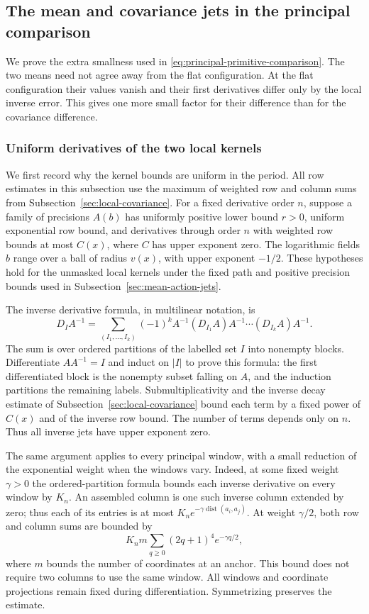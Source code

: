 \subsection{The mean and covariance jets in the principal comparison}
\label{sec:principal-comparison-jets}
We prove the extra smallness used in
\eqref{eq:principal-primitive-comparison}. The two means need not
agree away from the flat configuration. At the flat configuration
their values vanish and their first derivatives differ only by the
local inverse error. This gives one more small factor for their
difference than for the covariance difference.

\subsubsection{Uniform derivatives of the two local kernels}
We first record why the kernel bounds are uniform in the period.
All row estimates in this subsection use the maximum of weighted
row and column sums from Subsection~\ref{sec:local-covariance}.
For a fixed derivative order $n$, suppose a family of precisions
$A(b)$ has uniformly positive lower bound $r>0$, uniform
exponential row bound, and derivatives through order $n$ with
weighted row bounds at most $C(x)$, where $C$ has upper exponent
zero. The logarithmic fields $b$ range over a ball of radius
$v(x)$, with upper exponent $-1/2$. These hypotheses hold for
the unmasked local kernels under the fixed path and positive
precision bounds used in Subsection~\ref{sec:mean-action-jets}.

The inverse derivative formula, in multilinear notation, is
\begin{equation}\label{eq:comparison-inverse-derivative}
 D_I A^{-1}=
 \sum_{(I_1,\ldots,I_k)}(-1)^k
     A^{-1}(D_{I_1}A)A^{-1}\cdots(D_{I_k}A)A^{-1}.
\end{equation}
The sum is over ordered partitions of the labelled set $I$ into
nonempty blocks. Differentiate $AA^{-1}=I$ and induct on $|I|$
to prove this formula: the first differentiated block is the
nonempty subset falling on $A$, and the induction partitions the
remaining labels. Submultiplicativity and the inverse decay
estimate of Subsection~\ref{sec:local-covariance} bound each term
by a fixed power of $C(x)$ and of the inverse row bound.
The number of terms depends only on $n$. Thus all inverse jets
have upper exponent zero.

The same argument applies to every principal window, with a
small reduction of the exponential weight when the windows vary.
Indeed, at some fixed weight $\gamma>0$ the ordered-partition
formula bounds each inverse derivative on every window by $K_n$.
An assembled column is one such inverse column extended by zero;
thus each of its entries is at most
$K_n e^{-\gamma\operatorname{dist}(a_i,a_j)}$. At weight
$\gamma/2$, both row and column sums are bounded by
\[
 K_n m\sum_{q\ge0}(2q+1)^4 e^{-\gamma q/2},
\]
where $m$ bounds the number of coordinates at an anchor. This
bound does not require two columns to use the same window.
All windows and coordinate projections remain fixed during
 differentiation. Symmetrizing preserves the estimate.

